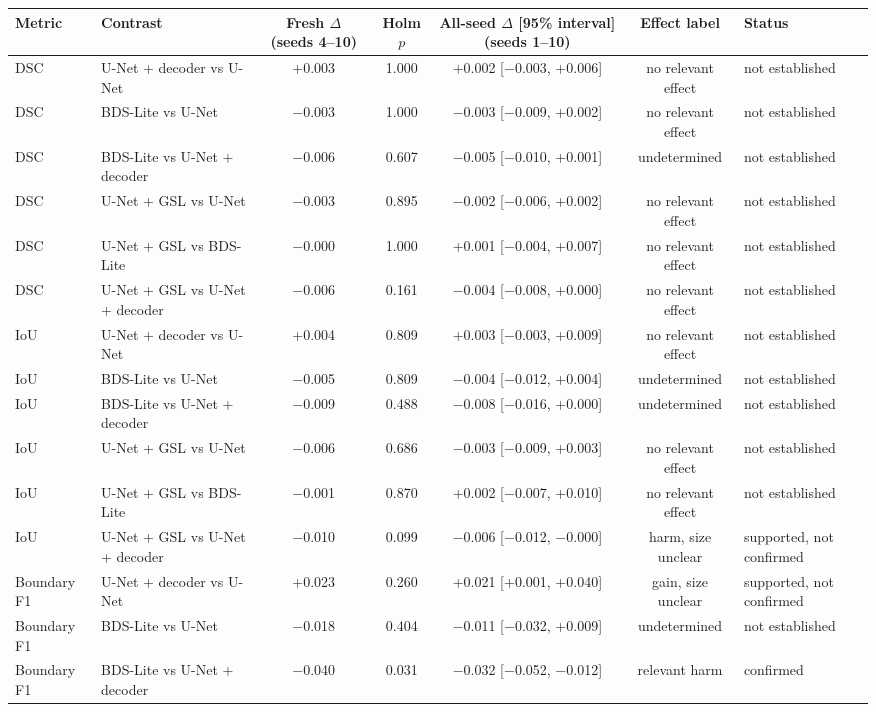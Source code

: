 \begin{tabular}{llccccl}
\toprule
Metric & Contrast & Fresh $\Delta$ (seeds 4--10) & Holm $p$ & All-seed $\Delta$ [95\% interval] (seeds 1--10) & Effect label & Status \\
\midrule
DSC & U-Net + decoder vs U-Net & +0.003 & 1.000 & +0.002 [$-$0.003, +0.006] & no relevant effect & not established \\
DSC & BDS-Lite vs U-Net & $-$0.003 & 1.000 & $-$0.003 [$-$0.009, +0.002] & no relevant effect & not established \\
DSC & BDS-Lite vs U-Net + decoder & $-$0.006 & 0.607 & $-$0.005 [$-$0.010, +0.001] & undetermined & not established \\
DSC & U-Net + GSL vs U-Net & $-$0.003 & 0.895 & $-$0.002 [$-$0.006, +0.002] & no relevant effect & not established \\
DSC & U-Net + GSL vs BDS-Lite & $-$0.000 & 1.000 & +0.001 [$-$0.004, +0.007] & no relevant effect & not established \\
DSC & U-Net + GSL vs U-Net + decoder & $-$0.006 & 0.161 & $-$0.004 [$-$0.008, +0.000] & no relevant effect & not established \\
\midrule
IoU & U-Net + decoder vs U-Net & +0.004 & 0.809 & +0.003 [$-$0.003, +0.009] & no relevant effect & not established \\
IoU & BDS-Lite vs U-Net & $-$0.005 & 0.809 & $-$0.004 [$-$0.012, +0.004] & undetermined & not established \\
IoU & BDS-Lite vs U-Net + decoder & $-$0.009 & 0.488 & $-$0.008 [$-$0.016, +0.000] & undetermined & not established \\
IoU & U-Net + GSL vs U-Net & $-$0.006 & 0.686 & $-$0.003 [$-$0.009, +0.003] & no relevant effect & not established \\
IoU & U-Net + GSL vs BDS-Lite & $-$0.001 & 0.870 & +0.002 [$-$0.007, +0.010] & no relevant effect & not established \\
IoU & U-Net + GSL vs U-Net + decoder & $-$0.010 & 0.099 & $-$0.006 [$-$0.012, $-$0.000] & harm, size unclear & supported, not confirmed \\
\midrule
Boundary F1 & U-Net + decoder vs U-Net & +0.023 & 0.260 & +0.021 [+0.001, +0.040] & gain, size unclear & supported, not confirmed \\
Boundary F1 & BDS-Lite vs U-Net & $-$0.018 & 0.404 & $-$0.011 [$-$0.032, +0.009] & undetermined & not established \\
Boundary F1 & BDS-Lite vs U-Net + decoder & $-$0.040 & 0.031 & $-$0.032 [$-$0.052, $-$0.012] & relevant harm & confirmed \\

\end{tabular}
